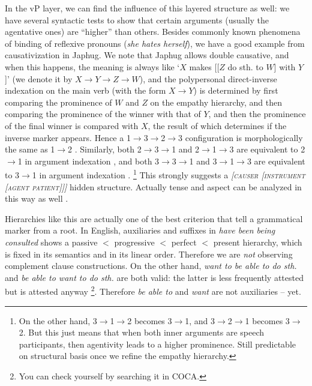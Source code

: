 \documentclass[a4paper, oneside, scheme=plain, 12pt]{article}
\newcommand*{\textto}{$\to$}
\newcommand*{\citesec}[1]{\S~{#1}}
\newcommand*{\citepage}[1]{p.~{#1}}
\newcommand{\form}[1]{\emph{#1}}
\newcommand*{\textlt}{$<$ }
\newcommand{\translate}[1]{`#1'}
\newcommand*{\category}[1]{\textsc{#1}}
\begin{document}
In the vP layer, we can find the influence of this layered structure as well:
we have several syntactic tests to show that certain arguments (usually the agentative ones)
are ``higher'' than others.
Besides commonly known phenomena of binding of reflexive pronouns (\form{she hates herself}),
we have a good example from causativization in Japhug.
We note that Japhug allows double causative,
and when this happens, the meaning is always like 
\translate{$X$ makes [[$Z$ do sth. to $W$] with $Y$]}
(we denote it by $X \to Y \to Z \to W$),
and the polypersonal direct-inverse indexation on the main verb (with the form $X \to Y$)
is determined by first comparing the prominence of $W$ and $Z$ on the empathy hierarchy,
and then comparing the prominence of the winner with that of $Y$,
and then the prominence of the final winner is compared with $X$,
the result of which determines if the inverse marker appears.
Hence a 1\textto 3\textto 2\textto 3 configuration
is morphologically the same as 1\textto 2
\citep[\citepage{848}, (67)]{jacques2021grammar}.
Similarly, both 2\textto 3\textto 1 and 2\textto 1\textto 3 
are equivalent to 2\textto 1 in argument indexation
\citep[\citepage{584}]{jacques2021grammar},
and both 3\textto 3\textto 1 and 3\textto 1\textto 3 
are equivalent to 3\textto 1 in argument indexation
\citep[\citepage{310}]{jacques2021grammar}.%
\footnote{
    On the other hand, 3\textto 1\textto 2 becomes 3\textto 1,
    and 3\textto 2\textto 1 becomes 3\textto 2.
    But this just means that when both inner arguments are speech participants,
    then agentivity leads to a higher prominence.
    Still predictable on structural basis
    once we refine the empathy hierarchy.
}
This strongly suggests a \form{[\category{causer} [\category{instrument} [\category{agent} \category{patient}]]]} hidden structure.
Actually tense and aspect can be analyzed in this way as well 
\citet[\citesec{7.4.1}]{wiltschko2014universal}.

Hierarchies like this are actually one of the best criterion that tell a grammatical marker from a root.
In English, auxiliaries and suffixes in \form{have been being consulted} 
shows a passive \textlt progressive \textlt perfect \textlt present hierarchy,
which is fixed in its semantics and in its linear order.
Therefore we are \emph{not} observing complement clause constructions.
On the other hand, \form{want to be able to do sth.}
and \form{be able to want to do sth.} are both valid:
the latter is less frequently attested but is attested anyway%
\footnote{
    You can check yourself by searching it in COCA.
}.
Therefore \form{be able to} and \form{want} are not auxiliaries -- yet.
\end{document}
